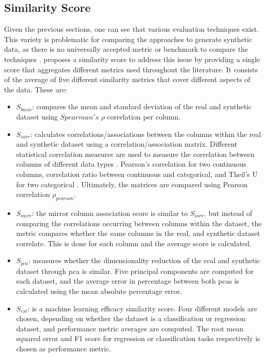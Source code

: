 \subsection{Similarity Score}
\label{ch:preliminaries-similarityScore}
Given the previous sections, one can see that various evaluation techniques exist.
This variety is problematic for comparing the approaches to generate synthetic data, as there is no universally accepted metric or benchmark to compare the techniques \cite{hernandez2022SyntheticDataGeneration, chundawat2022UniversalMetricRobust}.
\textcite{brenninkmeijer2019GenerationEvaluationTabular} proposes a similarity score to address this issue by providing a single score that aggregates different metrics used throughout the literature. 
It consists of the average of five different similarity metrics that cover different aspects of the data. These are:
\begin{itemize}
  \item $S_{basic}$: compares the mean and standard deviation of the real and synthetic dataset using $Spearman's$ $\rho$ \cite{lane2003IntroductionStatistics} correlation per column.
  \item $S_{corr}$: calculates correlations/associations between the columns within the real and synthetic dataset using a correlation/association matrix. 
  Different statistical correlation measures are used to measure the correlation between columns of different data types \cite[p. 37]{brenninkmeijer2019GenerationEvaluationTabular}.
  Pearson's correlation for two continuous columns, correlation ratio between continuous and categorical, and Theil's U for two categorical \cite{brenninkmeijer2019GenerationEvaluationTabular, lane2003IntroductionStatistics}.  
  Ultimately, the matrices are compared using Pearson correlation $\rho_{pearson}$.
  \item $S_{mirr}$: the mirror column association score is similar to $S_{corr}$, but instead of comparing the correlations occurring between columns within the dataset,
  the metric compares whether the same columns in the real, and synthetic dataset correlate.
  This is done for each column and the average score is calculated.
  \item $S_{pca}$: measures whether the dimensionality reduction of the real and synthetic dataset through \gls{pca} is similar.
  Five principal components are computed for each dataset, and the average error in percentage between both \glspl{pca} is calculated using the mean absolute percentage error.
  \item $S_{est}$: is a machine learning efficacy similarity score. Four different models are chosen, depending on whether the dataset is a classification or regression dataset, and performance metric averages are computed.
  The root mean squared error and F1 score for regression or classification tasks respectively is chosen as performance metric.
\end{itemize}


